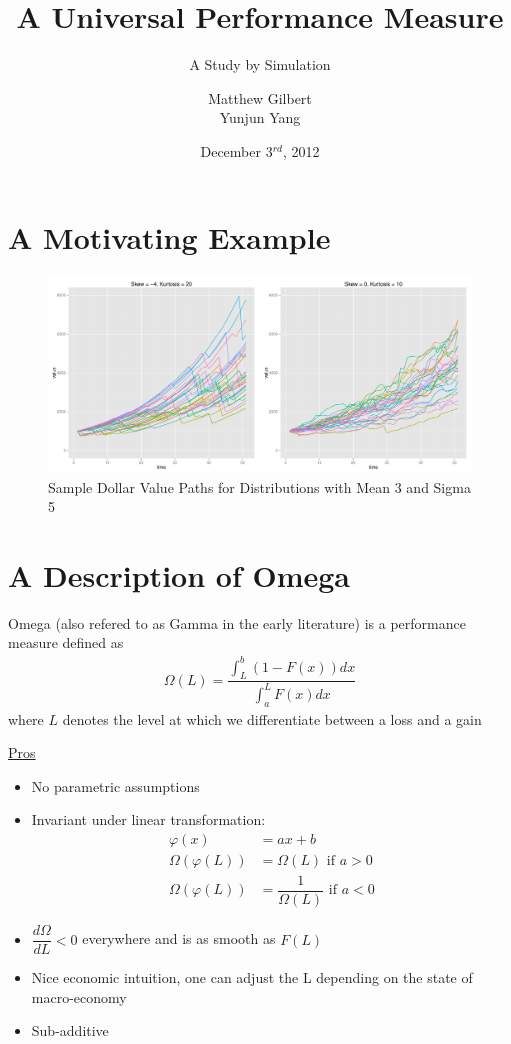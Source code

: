 \documentclass{beamer}
\title{A Universal Performance Measure}
\subtitle{A Study by Simulation}
\author{Matthew Gilbert \\ Yunjun Yang}
\date{December 3$^{rd}$, 2012}
\begin{document}
\titlepage
{}
 
\section{A Motivating Example}
\begin{frame}
\begin{figure}
\includegraphics[width=4.5in]{plots/DVApaths2.pdf}
\caption{Sample Dollar Value Paths for Distributions with Mean 3 and Sigma 5}
\end{figure}
\end{frame}


\section{A Description of Omega}
\begin{frame}
Omega (also refered to as Gamma in the early literature)\cite{shadwick2002} is a performance measure defined as
\begin{align}
\Omega(L) = \dfrac{\int_L^b (1 - F(x))dx}{\int_a^L F(x)dx} \nonumber
\end{align}
where $L$ denotes the level at which we differentiate between a loss and a gain
\end{frame}

\begin{frame}
\underline{Pros}
\begin{itemize}
\item No parametric assumptions
\item Invariant under linear transformation:
\begin{align}
\varphi(x) 			&= ax + b \nonumber \\
\Omega(\varphi(L)) 	&= \Omega(L) \text{ if } a > 0 \nonumber \\
\Omega(\varphi(L)) 	&= \dfrac{1}{\Omega(L)} \text{ if } a < 0 \nonumber
\end{align}
\item $\dfrac{d\Omega}{dL} < 0$ everywhere and is as smooth as $F(L)$
\item Nice economic intuition, one can adjust the L depending on the state of macro-economy
\item Sub-additive
\end{itemize}
\end{frame}
\end{document}
